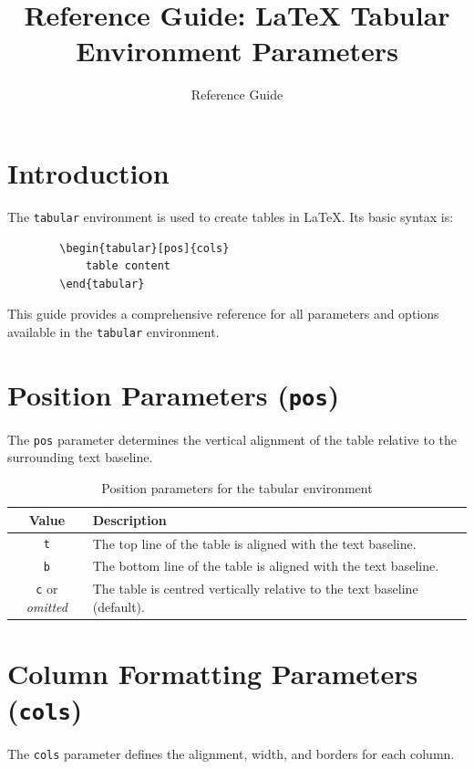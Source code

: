 \documentclass[12pt]{article}
\begin{document}
	
	\title{\textbf{Reference Guide: LaTeX Tabular Environment Parameters}}
	\author{Reference Guide}
	\date{}
	\maketitle
	
	\section*{Introduction}
	The \texttt{tabular} environment is used to create tables in LaTeX. Its basic syntax is:
	
	\begin{verbatim}
		\begin{tabular}[pos]{cols}
			table content
		\end{tabular}
	\end{verbatim}
	
	This guide provides a comprehensive reference for all parameters and options available in the \texttt{tabular} environment.
	
	\section{Position Parameters (\texttt{pos})}
	The \texttt{pos} parameter determines the vertical alignment of the table relative to the surrounding text baseline.
	
	\begin{table}[h]
		\centering
		\begin{tabular}{|c|p{10cm}|}
			\hline
			\textbf{Value} & \textbf{Description} \\
			\hline
			\texttt{t} & The top line of the table is aligned with the text baseline. \\
			\hline
			\texttt{b} & The bottom line of the table is aligned with the text baseline. \\
			\hline
			\texttt{c} or \textit{omitted} & The table is centred vertically relative to the text baseline (default). \\
			\hline
		\end{tabular}
		\caption{Position parameters for the tabular environment}
		\label{tab:pos}
	\end{table}
	
	\section{Column Formatting Parameters (\texttt{cols})}
	The \texttt{cols} parameter defines the alignment, width, and borders for each column.
	
\end{document}
